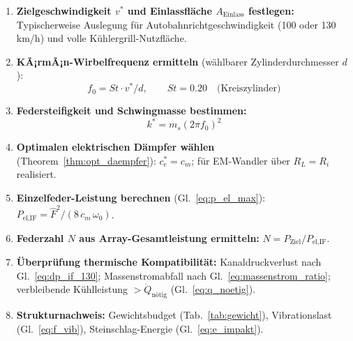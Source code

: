 ﻿\documentclass[12pt, a4paper]{report}
\theoremstyle{definition}
\theoremstyle{remark}
\newcommand{\Aeinlass}{A_{\text{Einlass}}}
\begin{document}
\begin{enumerate}[leftmargin=2em]
  \item \textbf{Zielgeschwindigkeit $v^*$ und Einlassfläche $\Aeinlass$ festlegen:}
        Typischerweise Auslegung für Autobahnrichtgeschwindigkeit
        (100 oder 130\,km/h) und volle Kühlergrill-Nutzfläche.

  \item \textbf{KÃ¡rmÃ¡n-Wirbelfrequenz ermitteln} (wählbarer Zylinderdurchmesser $d$):
        \begin{equation}
          f_0 = St \cdot v^*/d, \qquad St = 0.20 \quad \text{(Kreiszylinder)}
          \label{eq:ausleg_f0}
        \end{equation}

  \item \textbf{Federsteifigkeit und Schwingmasse bestimmen:}
        \begin{equation}
          k^* = m_s (2\pi f_0)^2
          \label{eq:ausleg_k}
        \end{equation}

  \item \textbf{Optimalen elektrischen Dämpfer wählen} (Theorem~\ref{thm:opt_daempfer}):
        $c_e^* = c_m$; für EM-Wandler über $R_L = R_i$ realisiert.

  \item \textbf{Einzelfeder-Leistung berechnen} (Gl.~\eqref{eq:p_el_max}):
        $P_{\text{el,IF}} = \hat{F}^2 / (8\,c_m\,\omega_0)$.

  \item \textbf{Federzahl $N$ aus Array-Gesamtleistung ermitteln:}
        $N = P_{\text{Ziel}} / P_{\text{el,IF}}$.

  \item \textbf{Überprüfung thermische Kompatibilität:} Kanaldruckverlust nach
        Gl.~\eqref{eq:dp_if_130}; Massenstromabfall nach Gl.~\eqref{eq:massenstrom_ratio};
        verbleibende Kühlleistung $> \dot{Q}_{\text{nötig}}$ (Gl.~\eqref{eq:q_noetig}).

  \item \textbf{Strukturnachweis:} Gewichtsbudget (Tab.~\ref{tab:gewicht}),
        Vi\-brations\-last (Gl.~\eqref{eq:f_vib}), Stein\-schlag-Energie
        (Gl.~\eqref{eq:e_impakt}).
\end{enumerate}

\end{document}
